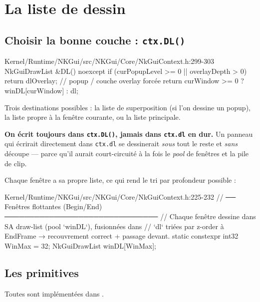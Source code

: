 \section{La liste de dessin}

\subsection{Choisir la bonne couche : \texttt{ctx.DL()}}

\begin{nkcode}{Kernel/Runtime/NKGui/src/NKGui/Core/NkGuiContext.h:299-303}
NkGuiDrawList &DL() noexcept {
    if (curPopupLevel >= 0 || overlayDepth > 0)
        return dlOverlay;                  // popup / couche overlay forcée
    return curWindow >= 0 ? winDL[curWindow] : dl;
}
\end{nkcode}

Trois destinations possibles : la liste de superposition (si l'on dessine un
popup), la liste propre à la fenêtre courante, ou la liste principale.

\begin{nkretenir}
\textbf{On écrit toujours dans \texttt{ctx.DL()}, jamais dans \texttt{ctx.dl} en
dur.} Un panneau qui écrirait directement dans \texttt{ctx.dl} se dessinerait
\emph{sous} tout le reste et \emph{sans} découpe — parce qu'il aurait
court-circuité à la fois le \emph{pool} de fenêtres et la pile de clip.
\end{nkretenir}

Chaque fenêtre a sa propre liste, ce qui rend le tri par profondeur possible :

\begin{nkcode}{Kernel/Runtime/NKGui/src/NKGui/Core/NkGuiContext.h:225-232}
// ── Fenêtres flottantes (Begin/End) ───────────────────────────────
// Chaque fenêtre dessine dans SA draw-list (pool `winDL`), fusionnées dans
// `dl` triées par z-order à EndFrame → recouvrement correct + passage devant.
static constexpr int32 WinMax = 32;
NkGuiDrawList winDL[WinMax];
\end{nkcode}

\subsection{Les primitives}

Toutes sont implémentées dans .

